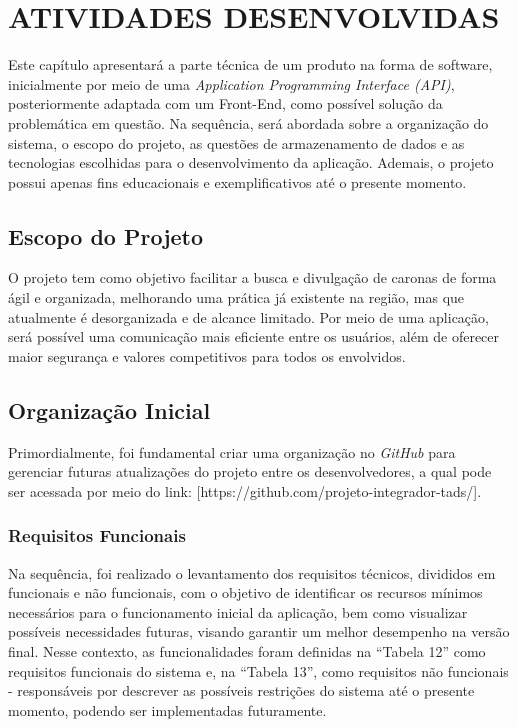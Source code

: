 \chapter{ATIVIDADES DESENVOLVIDAS}

Este capítulo apresentará a parte técnica de um produto na forma de software, inicialmente por meio de uma \textit{Application Programming Interface (API)}, posteriormente adaptada com um Front-End, como possível solução da problemática em questão. Na sequência, será abordada sobre a organização do sistema, o escopo do projeto, as questões de armazenamento de dados e as tecnologias escolhidas para o desenvolvimento da aplicação. Ademais, o projeto possui apenas fins educacionais e exemplificativos até o presente momento.

\section{Escopo do Projeto}

O projeto tem como objetivo facilitar a busca e divulgação de caronas de forma ágil e organizada, melhorando uma prática já existente na região, mas que atualmente é desorganizada e de alcance limitado. Por meio de uma aplicação, será possível uma comunicação mais eficiente entre os usuários, além de oferecer maior segurança e valores competitivos para todos os envolvidos.


\section{Organização Inicial}

Primordialmente, foi fundamental criar uma organização no\textit{ GitHub} para gerenciar futuras atualizações do projeto entre os desenvolvedores, a qual pode ser acessada por meio do link: [https://github.com/projeto-integrador-tads/].

\subsection{Requisitos Funcionais}

Na sequência, foi realizado o levantamento dos requisitos técnicos, divididos em funcionais e não funcionais, com o objetivo de identificar os recursos mínimos necessários para o funcionamento inicial da aplicação, bem como visualizar possíveis necessidades futuras, visando garantir um melhor desempenho na versão final. Nesse contexto, as funcionalidades foram definidas na ``Tabela 12'' como requisitos funcionais do sistema e, na ``Tabela 13'', como requisitos não funcionais - responsáveis por descrever as possíveis restrições do sistema até o presente momento, podendo ser implementadas futuramente.

